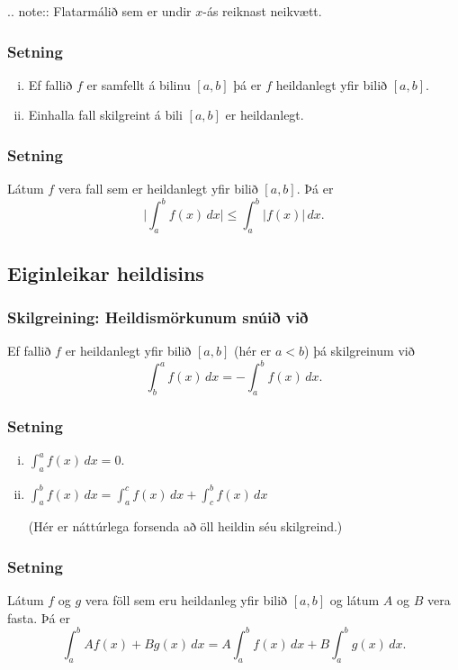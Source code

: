 \documentclass[icelandic,a4paper,12pt]{article}
\begin{document}
.. note::
  Flatarmálið sem er undir $x$-ás reiknast neikvætt.

\subsubsection{Setning}
\begin{enumerate}[(i)]
\item Ef fallið $f$ er samfellt á bilinu $[a, b]$ þá er $f$ heildanlegt yfir bilið $[a, b]$.
\item Einhalla fall skilgreint á bili $[a,b]$ er heildanlegt.
\end{enumerate}
 
\subsubsection{Setning}
Látum $f$ vera fall sem er heildanlegt yfir bilið $[a, b]$. Þá er 
$$
  \Big|\int_a^b f(x)\,dx\Big|\leq \int_a^b |f(x)|\,dx.
$$

\subsection{Eiginleikar heildisins}

\subsubsection{Skilgreining: Heildismörkunum snúið við} 
Ef fallið $f$ er heildanlegt yfir bilið $[a,b]$ (hér er $a<b$) þá skilgreinum við 
$$\int_b^a f(x)\,dx=-\int_a^b f(x)\,dx.$$

\subsubsection{Setning}  
\begin{enumerate}[(i)]
\item $\int_a^a f(x)\,dx=0$. 
\item $\int_a^b f(x)\,dx=\int_a^c f(x)\,dx+\int_c^b f(x)\,dx$ 

(Hér er náttúrlega forsenda að öll heildin séu skilgreind.)
\end{enumerate}
 
\subsubsection{Setning} 
Látum $f$ og $g$ vera föll sem eru heildanleg yfir bilið $[a,b]$ og látum
$A$ og $B$ vera fasta.  
Þá er $$
  \int_a^b Af(x)+Bg(x)\,dx=A\int_a^b f(x)\,dx+B\int_a^b g(x)\,dx.
$$
 
\end{document}

